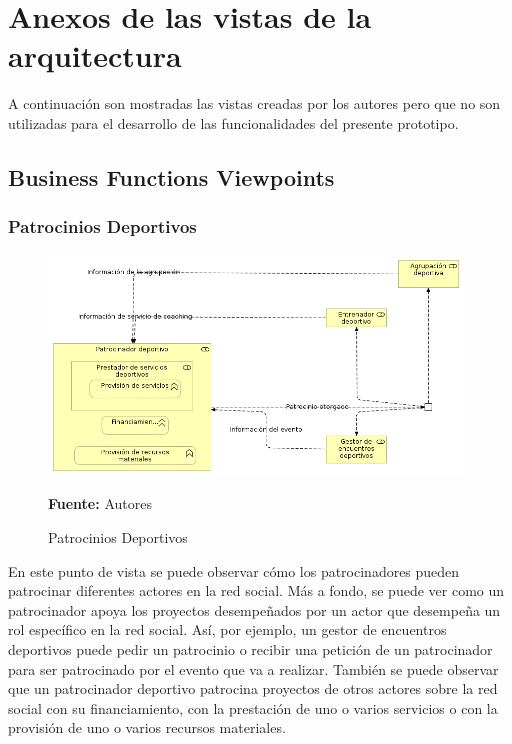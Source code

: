 \section{Anexos de las vistas de la arquitectura}

A continuación son mostradas las vistas creadas por los autores pero que no son utilizadas para el desarrollo de las funcionalidades del presente prototipo.

\subsection{Business Functions Viewpoints}

\subsubsection{Patrocinios Deportivos}

\begin{figure}[!htb]
  \begin{center}
    \includegraphics[width=11cm]{./imagenes/business_functions/patrociniosdeportivos.png}
    \caption{Patrocinios Deportivos}
    \label{fig:bf_patrocinios_deportivos}
    \textbf{Fuente:}  Autores
  \end{center}
\end{figure}

En este punto de vista se puede observar cómo los patrocinadores pueden patrocinar diferentes actores en la red social. Más a fondo, se puede ver como un patrocinador apoya los proyectos desempeñados por un actor que desempeña un rol específico en la red social. Así, por ejemplo, un gestor de encuentros deportivos puede pedir un patrocinio o recibir una petición de un patrocinador para ser patrocinado por el evento que va a realizar. También se puede observar que un patrocinador deportivo patrocina proyectos de otros actores sobre la red social con su financiamiento, con la prestación de uno o varios servicios o con la provisión de uno o varios recursos materiales.

